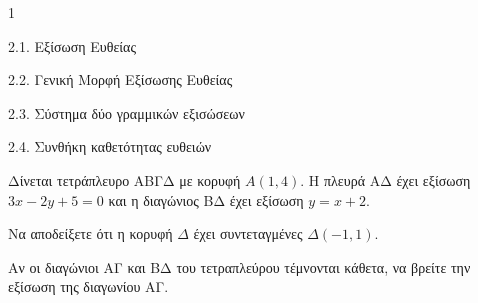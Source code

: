 \begin{ylh}{1}
    \item 2.1. Εξίσωση Ευθείας
    \item 2.2. Γενική Μορφή Εξίσωσης Ευθείας
    \item 2.3. Σύστημα δύο γραμμικών εξισώσεων
    \item 2.4. Συνθήκη καθετότητας ευθειών
\end{ylh}
Δίνεται τετράπλευρο ΑΒΓΔ με κορυφή $A(1,4)$. Η πλευρά ΑΔ έχει εξίσωση $3x - 2y + 5 = 0$ και η διαγώνιος ΒΔ έχει εξίσωση $y = x + 2$.
\begin{alist}
\item Να αποδείξετε ότι η κορυφή $\Delta$ έχει συντεταγμένες $\Delta(-1,1)$. 
\item Αν οι διαγώνιοι ΑΓ και ΒΔ του τετραπλεύρου τέμνονται κάθετα, να βρείτε την εξίσωση της διαγωνίου ΑΓ. 
\end{alist}